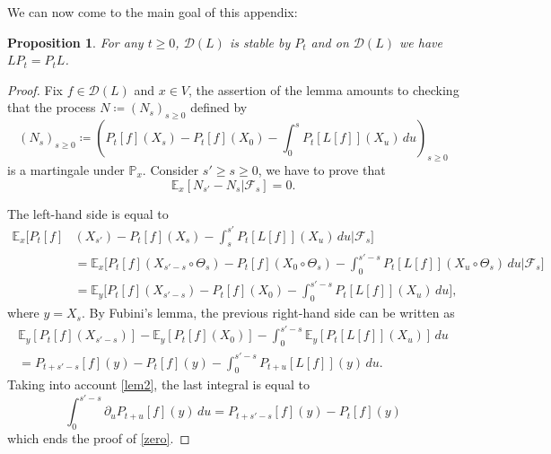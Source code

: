 \documentclass[10pt]{amsart}
\theoremstyle{plain}
\newtheorem{prop}[thm]{Proposition}
\theoremstyle{definition}
\newcommand{\EE}{{\mathbb E}}
\newcommand{\PP}{{\mathbb P}}
\newcommand\df{\coloneqq}
\newcommand{\bq}{\begin{equation*}}
\newcommand{\bqn}[1]{\begin{equation}\label{#1}}
\newcommand{\eq}{\end{equation*}}
\newcommand{\eqn}{\end{equation}}
\newcommand{\lt}{\left}
\newcommand{\rt}{\right}
\let\pa\partial
\newcommand{\cD}{\mathcal{D}}
\newcommand{\cF}{\mathcal{F}}
\begin{document}
\par
We can now come to the main goal of this appendix:
\begin{prop}\label{pro1}
For any $t\geq 0$, $\cD(L)$ is stable by $P_t$ and on $\cD(L)$ we have $LP_t=P_tL$.
\end{prop}
\begin{proof}
Fix $f\in\cD(L)$ and $x\in V$, the assertion of the lemma amounts to checking that the process $N\df (N_s)_{s\geq 0}$ defined by
\bq
(N_s)_{s\geq 0}\df \lt(P_t[f](X_s)-P_t[f](X_0)-\int_0^s P_t[L[f]](X_u)\,du\rt)_{s\geq 0}\eq
is a martingale under $\PP_x$.
Consider $s'\geq s\geq 0$, we have to prove that
\bqn{zero}
\EE_x[N_{s'}-N_s\vert\cF_s]=0.\eqn
\par
The left-hand side is equal to
\begin{align*}
\EE_x\biggl[ P_t[f]&(X_{s'})-P_t[f](X_s)-\int_s^{s'} P_t[L[f]](X_u)\,du \Big\vert\cF_s\biggr]\\
&=
\EE_x\biggl[ P_t[f](X_{s'-s}\circ \Theta_s)-P_t[f](X_0\circ \Theta_s)-\int_0^{s'-s} P_t[L[f]](X_u\circ \Theta_s)\,du \Big\vert\cF_s\biggr]\\
&=\EE_y\biggl[ P_t[f](X_{s'-s})-P_t[f](X_0)-\int_0^{s'-s} P_t[L[f]](X_u)\,du\biggr],
\end{align*}
where $y=X_s$. By Fubini's lemma, the previous right-hand side can be written as
\begin{multline*}
\EE_y\lt[ P_t[f](X_{s'-s})\rt]-\EE_y\lt[ P_t[f](X_0)\rt]-\int_0^{s'-s} \EE_y[P_t[L[f]](X_u)]\,du\\
=P_{t+s'-s}[f](y)-P_t[f](y)-\int_0^{s'-s} P_{t+u}[L[f]](y)\,du.
\end{multline*}
Taking into account \eqref{lem2}, the last integral is equal to
\bq
\int_0^{s'-s} \pa_u P_{t+u}[f](y)\,du=P_{t+s'-s}[f](y)-P_t[f](y)\eq
which ends the proof of \eqref{zero}.
\end{proof}
\end{document}

